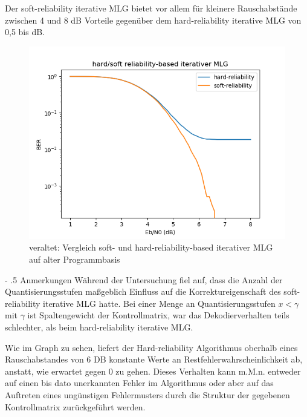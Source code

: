 \documentclass[11pt,a4paper]{article}
\makeatletter
\renewcommand\paragraph{%
\@startsection{paragraph}{4}{0mm}%
{-\baselineskip}%
{.5\baselineskip}%
{\normalfont\normalsize\bfseries}}
\makeatother
\begin{document}
Der soft-reliability iterative MLG bietet vor allem für kleinere Rauschabstände zwischen 4 und 8 dB Vorteile gegenüber dem hard-reliability iterative MLG von 0,5 bis dB. 

\begin{figure}[hb]
	\includegraphics[width=\linewidth]{foo.png}
	\caption{veraltet: Vergleich soft- und hard-reliability-based iterativer MLG auf alter Programmbasis}
	\label{fig:plot}
\end{figure}


\paragraph{Anmerkungen} Während der Untersuchung fiel auf, dass die Anzahl der Quantisierungsstufen maßgeblich Einfluss auf die Korrektureigenschaft des soft-reliability iterative MLG hatte. Bei einer Menge an Quantisierungsstufen $x < \gamma $ mit $\gamma$ ist Spaltengewicht der Kontrollmatrix, war das Dekodierverhalten teils schlechter, als beim hard-reliability iterative MLG.

Wie im Graph zu sehen, liefert der Hard-reliability Algorithmus oberhalb eines Rauschabstandes von 6 DB konstante Werte an Restfehlerwahrscheinlichkeit ab, anstatt, wie erwartet gegen 0 zu gehen. Dieses Verhalten kann m.M.n. entweder auf einen bis dato unerkannten Fehler im Algorithmus oder aber auf das Auftreten eines ungünstigen Fehlermusters durch die Struktur der gegebenen Kontrollmatrix zurückgeführt werden. 
\end{document}

